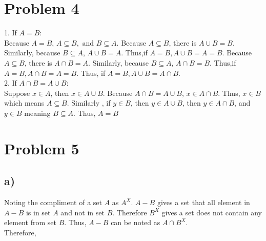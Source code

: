 \documentclass[a4paper,fleqn]{article}
\begin{document}
\section*{Problem 4}
    1. If \(A=B\):\\ 
    Because \(A=B\), \(A \subseteq B, \text{ and }B\subseteq A\). Because \(A\subseteq B\), there is \(A\cup B = B\). Similarly, 
    because \(B\subseteq A\), \(A\cup B = A\). Thus,if \( A=B, A\cup B = A = B\). Because \(A\subseteq B\), there is \(A\cap B = A\). Similarly, 
    because \(B\subseteq A\), \(A\cap B = B\). Thus,if \( A=B, A\cap B = A = B\). Thus, if \( A=B, A\cup B = A\cap B\).
    \\2. If \(A\cap B = A\cup B\):\\
    Suppose \(x\in A\), then \(x\in A\cup B\). Because \(A\cap B = A\cup B\), \(x\in A\cap B\). Thus, \(x\in B\) which means 
    \(A \subseteq B\). Similarly , if \(y\in B\), then \(y\in A\cup B\), then \(y\in A\cap B\), and \(y\in B\) meaning \(B\subseteq A\). Thus, \(A=B\)
\section*{Problem 5}
    \subsection*{a)}
        Noting the compliment of a set \(A\) as \(A^X\). \(A-B\) gives a set that all element in \(A-B\) is in set \(A\)
        and not in set \(B\). Therefore \(B^X\) gives a set does not contain any element from set \(B\). 
        Thus, \(A-B\) can be noted as \(A\cap B^X\). \\
        Therefore,
\end{document}

